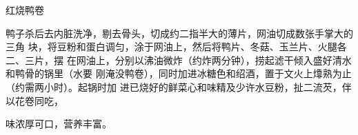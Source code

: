 %
%
%
%
%
%
%
\begin{recipe}{红烧鸭卷}

\ingredients


\preparation

鸭子杀后去内脏洗净，剔去骨头，切成约二指半大的薄片，网油切成数张手掌大的三角
块，将豆粉和蛋白调匀，涂于网油上，然后将鸭片、冬菇、玉兰片、火腿各二、三片，摆
在网油上，分别以沸油微炸（约炸两分钟），捞起滤干倾入盛好清水和鸭骨的锅里（水要
刚淹没鸭卷），同时加进冰糖色和绍酒，置于文火上㸆熟为止（约需两小时）。起锅时加
进已烧好的鲜菜心和味精及少许水豆粉，扯二流芡，伴以花卷同吃，

\features

味浓厚可口，营养丰富。

\end{recipe}

